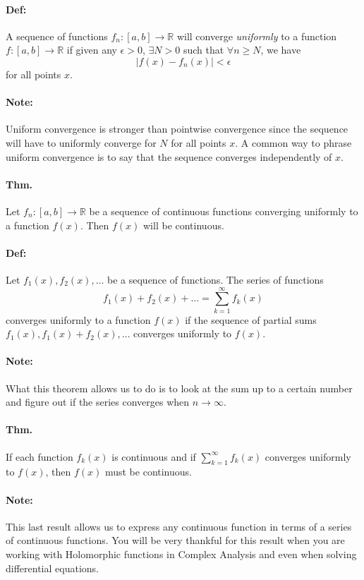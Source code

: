 \documentclass[10pt,a4paper]{article}
\begin{document}
\paragraph{Def:} A sequence of functions $f_n:[a,b] \to \mathbb{R}$ will converge \textit{uniformly} to a function $f:[a,b] \to \mathbb{R}$ if given any $\epsilon >0$, $\exists N > 0$ such that $\forall n \geq N$, we have
$$ |f(x)-f_n(x)| < \epsilon$$
for all points $x$.

\paragraph{Note:} Uniform convergence is stronger than pointwise convergence since the sequence will have to uniformly converge for $N$ for all points $x$. A common way to phrase uniform convergence is to say that the sequence converges independently of $x$.

\paragraph{Thm.} Let $f_n:[a,b] \to \mathbb{R}$ be a sequence of continuous functions converging uniformly to a function $f(x)$. Then $f(x)$ will be continuous.

\paragraph{Def:} Let $f_1(x),f_2(x),\dots$ be a sequence of functions. The series of functions
$$ f_1(x)+f_2(x)+\dots = \sum_{k=1}^\infty f_k(x)$$
converges uniformly to a function $f(x)$ if the sequence of partial sums $f_1(x), f_1(x)+f_2(x), \dots$ converges uniformly to $f(x)$.

\paragraph{Note:} What this theorem allows us to do is to look at the sum up to a certain number and figure out if the series converges when $n \to \infty$.

\paragraph{Thm.} If each function $f_k(x)$ is continuous and if $\sum_{k=1}^\infty f_k(x)$ converges uniformly to $f(x)$, then $f(x)$ must be continuous.

\paragraph{Note:} This last result allows us to express any continuous function in terms of a series of continuous functions. You will be very thankful for this result when you are working with Holomorphic functions in Complex Analysis and even when solving differential equations. 
\end{document}
